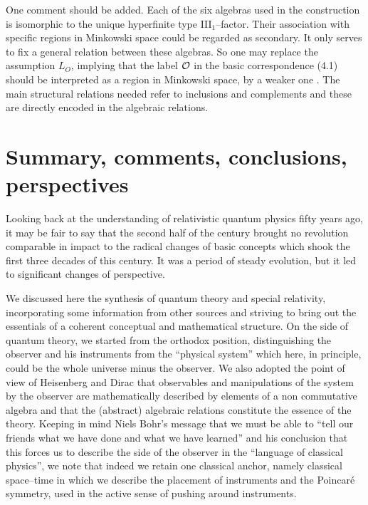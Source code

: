 One comment should be added. Each of the six algebras used in the
construction is isomorphic to the unique hyperfinite type
III$_1$--factor. Their association with specific regions in Minkowski
space could be regarded as secondary. It only serves to fix a general
relation between these algebras. So one may replace the assumption
$L_O$, implying that the label 
${\cal O}$ in the basic correspondence (4.1) 
should be interpreted as a region in Minkowski space, by a weaker
one \cite{BuDrFlSu}. 
The main structural relations needed refer to inclusions and
complements and these are directly encoded in the algebraic relations.

\section{Summary, comments, conclusions, perspectives}
\setcounter{equation}{0}

Looking back at the understanding of relativistic quantum 
physics fifty years ago, it may be fair to say that the second
half of the century brought no revolution comparable in impact
to the radical changes of basic concepts which shook the first
three decades of this century. It was a period of steady evolution, 
but it led to significant changes of perspective.

We discussed here the synthesis of quantum theory and special 
relativity, incorporating some information from other sources 
and striving to bring out the essentials of a coherent conceptual
and mathematical structure. On the side of quantum theory, we 
started from the orthodox position, distinguishing the observer
and his instruments from the ``physical system'' which here, in 
principle, could be the whole universe minus the observer. We also
adopted the point of view of Heisenberg and Dirac that observables 
and manipulations of the system by the observer are mathematically
described by elements of a non commutative algebra and that the 
(abstract) algebraic relations constitute the essence of the theory.
Keeping in mind Niels Bohr's message that we must be able to 
``tell our friends what we have done and what we have learned''
and his conclusion that this forces us to describe the side of the
observer in the ``language of classical physics'', we note that indeed
we retain one classical anchor, namely classical space--time in 
which we describe the placement of instruments and the Poincar\'e 
symmetry, used in the active sense of pushing around instruments. 

